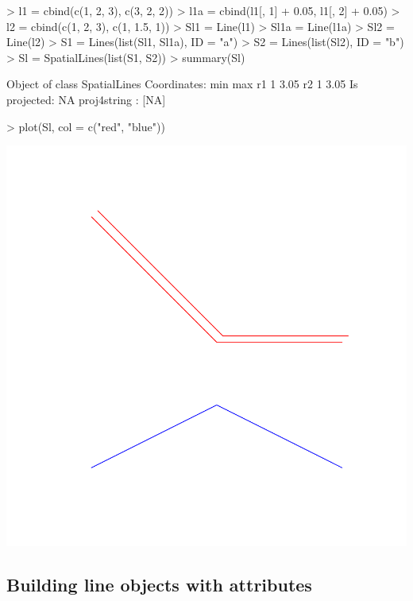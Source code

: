 \documentclass{article}
\begin{document}
\begin{Schunk}
\begin{Sinput}
> l1 = cbind(c(1, 2, 3), c(3, 2, 2))
> l1a = cbind(l1[, 1] + 0.05, l1[, 2] + 0.05)
> l2 = cbind(c(1, 2, 3), c(1, 1.5, 1))
> Sl1 = Line(l1)
> Sl1a = Line(l1a)
> Sl2 = Line(l2)
> S1 = Lines(list(Sl1, Sl1a), ID = "a")
> S2 = Lines(list(Sl2), ID = "b")
> Sl = SpatialLines(list(S1, S2))
> summary(Sl)
\end{Sinput}
\begin{Soutput}
Object of class SpatialLines
Coordinates:
   min  max
r1   1 3.05
r2   1 3.05
Is projected: NA 
proj4string : [NA]
\end{Soutput}
\begin{Sinput}
> plot(Sl, col = c("red", "blue"))
\end{Sinput}
\end{Schunk}
\includegraphics{sp-021}

\subsection{Building line objects with attributes}
\end{document}
